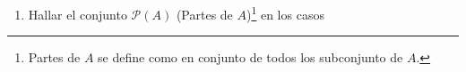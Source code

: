 \documentclass[a4paper,10pt]{article}
\newcommand{\resalta}[1]{\colorbox{g}{$\displaystyle #1$}}
\newlength\dlf
\newcommand\alignedbox[2]{
  &
  \begingroup
  \settowidth\dlf{$\displaystyle #1$}
  \addtolength\dlf{\fboxsep+\fboxrule}
  \hspace{-\dlf}
  \fcolorbox{g}{g}{$\displaystyle #1 #2$}
  \endgroup
}
\newcommand{\corchetes}[1][*]{
   $\{{#1}\}$
}
\begin{document}
\begin{enumerate}
\begin{enumerate}[label = \roman*)]
\begin{minipage}[t]{0.7\linewidth}
{\begin{align*}
                        &= ((A\cap B)\cup(A\cap C)\cup(B\cap C))\cap ((A\cap B)^{c}\cup(A\cap C)^{c}\cup(B\cap C)^{c})\\
                        &= ((A\cap B)\cup(A\cap C)\cup(B\cap C))\cap ((A^{c}\cup B^{c})\cup(A^{c}\cup C^{c})\cup(B^{c}\cup C^{c}))\\
                        \alignedbox{R}{= ((A\cap B)\cup(A\cap C)\cup(B\cap C))\cap(A^{c}\cup B^{c}\cup C^{c})}
                    \end{align*}\\
                }
            \end{minipage}
        \end{enumerate}
        \newpage
        \item Hallar el conjunto $\mathcal{P}(A)$ (Partes de $A$)\footnote{Partes de $A$ se define como en conjunto de todos los subconjunto de $A$.} en los casos
\end{enumerate}
\end{document}
